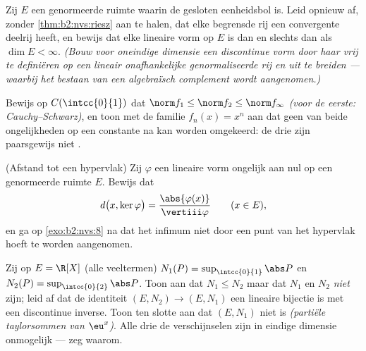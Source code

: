 \begin{exercise}[$\star\star\star$]\label{exo:b2:nvs:9}
Zij $E$ een genormeerde ruimte waarin de gesloten eenheidsbol
 is. Leid opnieuw af, zonder \cref{thm:b2:nvs:riesz} aan te
halen, dat elke begrensde rij een convergente deelrij heeft, en
bewijs dat elke lineaire vorm op $E$  is dan en slechts dan
als $\dim E < \infty$. \emph{(Bouw voor oneindige dimensie een
discontinue vorm door haar vrij te definiëren op een lineair
onafhankelijke genormaliseerde rij en uit te breiden --- waarbij
het bestaan van een algebraïsch complement wordt aangenomen.)}
\end{exercise}

\begin{exercise}[$\star\star$]\label{exo:b2:nvs:10}
Bewijs op $C(\intcc{0}{1})$ dat $\norm f_1 \leq \norm f_2 \leq
\norm f_\infty$ \emph{(voor de eerste: Cauchy--Schwarz)}, en toon
met de familie $f_n(x) = x^n$ aan dat geen van beide ongelijkheden
op een constante na kan worden omgekeerd: de drie  zijn
paarsgewijs niet .
\end{exercise}

\begin{exercise}[$\star\star$]\label{exo:b2:nvs:11}
(Afstand tot een hypervlak) Zij $\varphi$ een  lineaire
vorm ongelijk aan nul op een genormeerde ruimte $E$. Bewijs dat
\[
d\bigl(x, \ker\varphi\bigr) =
\frac{\abs{\varphi(x)}}{\vertiii\varphi}
\qquad (x \in E),
\]
en ga op \cref{exo:b2:nvs:8} na dat het infimum niet door een punt
van het hypervlak hoeft te worden aangenomen.
\end{exercise}

\begin{exercise}[$\star\star\star$]\label{exo:b2:nvs:12}
Zij op $E = \R[X]$ (alle veeltermen) $N_1(P) =
\sup_{\intcc{0}{1}}\abs P$ en $N_2(P) =
\sup_{\intcc{0}{2}}\abs P$. Toon aan dat $N_1 \leq N_2$ maar dat
$N_1$ en $N_2$ \emph{niet}  zijn; leid af dat de
identiteit $(E, N_2) \to (E, N_1)$ een  lineaire bijectie
is met een discontinue inverse. Toon ten slotte aan dat $(E, N_1)$
niet  is \emph{(partiële taylorsommen van $\eu^x$)}. Alle
drie de verschijnselen zijn in eindige dimensie onmogelijk ---
zeg waarom.
\end{exercise}

